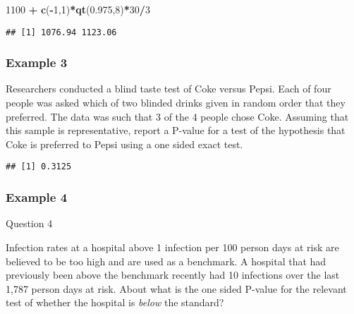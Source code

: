 \documentclass[
]{article}
\newenvironment{Shaded}{\begin{snugshade}}{\end{snugshade}}
\newcommand{\DataTypeTok}[1]{\textcolor[rgb]{0.13,0.29,0.53}{#1}}
\newcommand{\DecValTok}[1]{\textcolor[rgb]{0.00,0.00,0.81}{#1}}
\newcommand{\FloatTok}[1]{\textcolor[rgb]{0.00,0.00,0.81}{#1}}
\newcommand{\KeywordTok}[1]{\textcolor[rgb]{0.13,0.29,0.53}{\textbf{#1}}}
\newcommand{\NormalTok}[1]{#1}
\newcommand{\OperatorTok}[1]{\textcolor[rgb]{0.81,0.36,0.00}{\textbf{#1}}}
\newcommand{\StringTok}[1]{\textcolor[rgb]{0.31,0.60,0.02}{#1}}
\begin{document}
\begin{Shaded}
\begin{Highlighting}[]
\DecValTok{1100} \OperatorTok{+}\StringTok{ }\KeywordTok{c}\NormalTok{(}\OperatorTok{-}\DecValTok{1}\NormalTok{,}\DecValTok{1}\NormalTok{)}\OperatorTok{*}\KeywordTok{qt}\NormalTok{(}\FloatTok{0.975}\NormalTok{,}\DecValTok{8}\NormalTok{)}\OperatorTok{*}\DecValTok{30}\OperatorTok{/}\DecValTok{3}
\end{Highlighting}
\end{Shaded}

\begin{verbatim}
## [1] 1076.94 1123.06
\end{verbatim}

\hypertarget{example-3}{%
\subsubsection{Example 3}\label{example-3}}

Researchers conducted a blind taste test of Coke versus Pepsi. Each of
four people was asked which of two blinded drinks given in random order
that they preferred. The data was such that 3 of the 4 people chose
Coke. Assuming that this sample is representative, report a P-value for
a test of the hypothesis that Coke is preferred to Pepsi using a one
sided exact test.

\begin{Shaded}
\end{Shaded}

\begin{verbatim}
## [1] 0.3125
\end{verbatim}

\hypertarget{example-4}{%
\subsubsection{Example 4}\label{example-4}}

Question 4

Infection rates at a hospital above 1 infection per 100 person days at
risk are believed to be too high and are used as a benchmark. A hospital
that had previously been above the benchmark recently had 10 infections
over the last 1,787 person days at risk. About what is the one sided
P-value for the relevant test of whether the hospital is \emph{below}
the standard?
\end{document}
